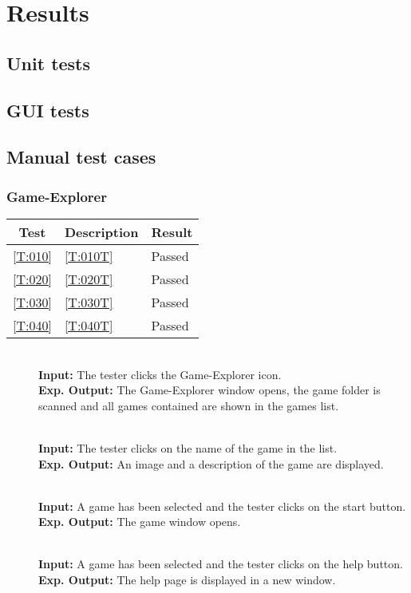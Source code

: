 \section{Results}
\subsection{Unit tests}
\subsection{GUI tests}
\subsection{Manual test cases}

\subsubsection{Game-Explorer}

\begin{tabular}{cll}
	\hline
	\textbf{Test} & \textbf{Description} & \textbf{Result} \\
	\hline
	\ref{T:010} & \ref{T:010T} & Passed \\
	\ref{T:020} & \ref{T:020T} & Passed \\
	\ref{T:030} & \ref{T:030T} & Passed \\
	\ref{T:040} & \ref{T:040T} & Passed \\
	\hline
\end{tabular}

\begin{description}
	\item[] \textbf{} \\
	\textbf{Input:} The tester clicks the Game-Explorer icon. \\
	\textbf{Exp. Output:} The Game-Explorer window opens, the game folder is scanned and all games contained are shown in the games list.
	
	\item[] \textbf{} \\
	\textbf{Input:} The tester clicks on the name of the game in the list. \\
	\textbf{Exp. Output:} An image and a description of the game are displayed.
	
	\item[] \textbf{} \\
	\textbf{Input:} A game has been selected and the tester clicks on the start button. \\
	\textbf{Exp. Output:} The game window opens.
	
	\item[] \textbf{} \\
	\textbf{Input:} A game has been selected and the tester clicks on the help button. \\
	\textbf{Exp. Output:} The help page is displayed in a new window.
\end{description}

